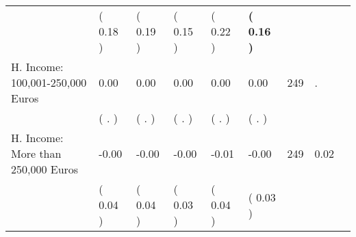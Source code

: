 \begin{tabular}{L{6.2cm} C{1.8cm} C{1.8cm} C{1.8cm} C{1.8cm} C{1.8cm} C{1.8cm} C{0.3cm} C{0.3cm}}
 & (     0.18 ) & (     0.19 ) & (     0.15 ) & (     0.22 ) & \textbf{(     0.16 )}  & \\
H. Income: 100,001-250,000 Euros &      0.00 &      0.00 &      0.00 &      0.00 &      0.00  & 249 &          . \\ 
 & (        . ) & (        . ) & (        . ) & (        . ) & (        . )  & \\
H. Income: More than 250,000 Euros &     -0.00 &     -0.00 &     -0.00 &     -0.01 &     -0.00  & 249 &       0.02 \\ 
 & (     0.04 ) & (     0.04 ) & (     0.03 ) & (     0.04 ) & (     0.03 )  & \\
\bottomrule
\end{tabular}

